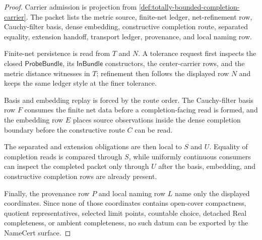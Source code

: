 \begin{proof}
Carrier admission is projection from \autoref{def:totally-bounded-completion-carrier}. The packet lists the metric source, finite-net ledger, net-refinement row, Cauchy-filter basis, dense embedding, constructive completion route, separated equality, extension handoff, transport ledger, provenance, and local naming row.

Finite-net persistence is read from $T$ and $N$. A tolerance request first inspects the closed $\mathsf{ProbeBundle}$, its $\mathsf{InBundle}$ constructors, the center-carrier rows, and the metric distance witnesses in $T$; refinement then follows the displayed row $N$ and keeps the same ledger style at the finer tolerance.

Basis and embedding replay is forced by the route order. The Cauchy-filter basis row $F$ consumes the finite net data before a completion-facing read is formed, and the embedding row $E$ places source observations inside the dense completion boundary before the constructive route $C$ can be read.

The separated and extension obligations are then local to $S$ and $U$. Equality of completion reads is compared through $S$, while uniformly continuous consumers can inspect the completed packet only through $U$ after the basis, embedding, and constructive completion rows are already present.

Finally, the provenance row $P$ and local naming row $L$ name only the displayed coordinates. Since none of those coordinates contains open-cover compactness, quotient representatives, selected limit points, countable choice, detached Real completeness, or ambient completeness, no such datum can be exported by the NameCert surface.
\end{proof}

